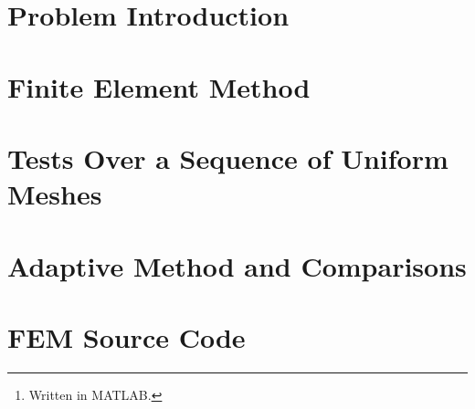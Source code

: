 \documentclass[12pt]{article}
\title{\reporttitle}
\author{Andrea Di Antonio, 858798 \\ \hyperlink{mailto:a.diantonio1@campus.unimib.it}{a.diantonio1@campus.unimib.it}}
\date{July 27, 2023 \\ Academic Year 2022-23}
\newcommand{\reporttitle}{Adaptive 1D 1st-order Lagrange FEM}
\begin{document}
	\maketitle
	\thispagestyle{fancy}

	\begin{abstract}
		\begin{center}
            Report for the course \textit{Metodi Numerici per Equazioni alle Derivate Parziali} on the definition and costruction of an \textit{\reporttitle}\footnote{Written in MATLAB.} and its subsequent analysis.
        \end{center}
	\end{abstract}

    \newpage
    \tableofcontents

    \newpage
    \section{Problem Introduction}
    

    \newpage
    \section{Finite Element Method}
    

    \newpage
    \section{Tests Over a Sequence of Uniform Meshes}

    \newpage
    \section{Adaptive Method and Comparisons}

    \newpage
    \section{FEM Source Code}
    
\end{document}
